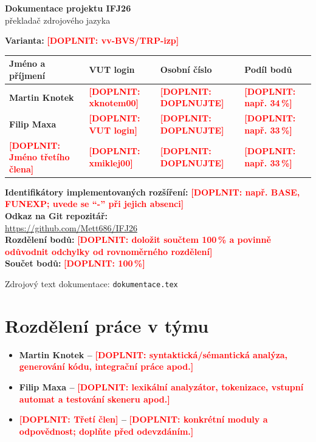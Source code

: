 \documentclass[11pt,a4paper]{article}
\newcommand{\placeholder}[1]{\textcolor{red}{\textbf{[DOPLNIT: #1]}}}
\begin{document}
\begin{titlepage}
\begin{center}
  {\LARGE \textbf{Dokumentace projektu IFJ26}}\\[0.5cm]
  {\large překladač zdrojového jazyka}\\[1.2cm]
\end{center}

\textbf{Varianta:} \placeholder{vv-BVS/TRP-izp}\\[0.25cm]

\begin{table}[h]
\centering
\begin{tabular}{>{\bfseries}p{3.7cm}p{4.2cm}p{2.8cm}p{2.7cm}}
\toprule
Jméno a příjmení & VUT login & Osobní číslo & Podíl bodů \\
\midrule
\textbf{Martin Knotek} & \placeholder{xknotem00} & \placeholder{DOPLNUJTE} & \placeholder{např. 34\,\%} \\
Filip Maxa & \placeholder{VUT login} & \placeholder{DOPLNUJTE} & \placeholder{např. 33\,\%} \\
\placeholder{Jméno třetího člena} & \placeholder{xmiklej00} & \placeholder{DOPLNUJTE} & \placeholder{např. 33\,\%} \\
\bottomrule
\end{tabular}
\end{table}

\textbf{Identifikátory implementovaných rozšíření:}
\placeholder{např. BASE, FUNEXP; uvede se ``-'' při jejich absenci}\\[0.25cm]

\textbf{Odkaz na Git repozitář:}\\
\url{https://github.com/Mett686/IFJ26}\\[0.25cm]

\textbf{Rozdělení bodů:}
\placeholder{doložit součtem 100\,\% a povinně odůvodnit odchylky od rovnoměrného rozdělení}\\
\textbf{Součet bodů:} \placeholder{100\,\%}

\vfill
\begin{center}
  {\small Zdrojový text dokumentace: \texttt{dokumentace.tex}}
\end{center}
\end{titlepage}

\tableofcontents
\newpage

\section{Rozdělení práce v týmu}
\begin{itemize}[leftmargin=*]
  \item \textbf{Martin Knotek -- } \placeholder{syntaktická/sémantická analýza, generování kódu, integrační práce apod.}
  \item \textbf{Filip Maxa -- } \placeholder{lexikální analyzátor, tokenizace, vstupní automat a testování skeneru apod.}
  \item \textbf{\placeholder{Třetí člen} -- } \placeholder{konkrétní moduly a odpovědnost; doplňte před odevzdáním.}
\end{itemize}
\end{document}
